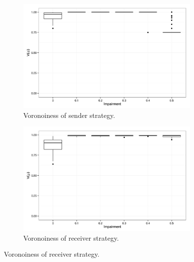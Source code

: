 \begin{figure}
        \begin{subfigure}{0.45\textwidth}
                \includegraphics[width=\textwidth]{plots/Speaker-Voronoiness-20140813-194306}
                \caption{Voronoiness of sender strategy.}
        \end{subfigure}
        \begin{subfigure}{0.45\textwidth}
                \includegraphics[width=\textwidth]{plots/Hearer-Voronoiness-20140813-194306}
                \caption{Voronoiness of receiver strategy.}
        \end{subfigure}


\end{figure}

